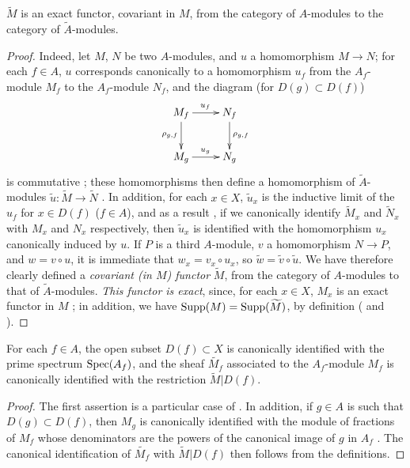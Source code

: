 \begin{proposition}[1.3.5]
\label{1.1.3.5}
$\widetilde{M}$ is an exact functor, covariant in $M$, from the category of $A$-modules to the category of $\widetilde{A}$-modules.
\end{proposition}

\begin{proof}
\label{proof-1.1.3.5}
Indeed, let $M$, $N$ be two $A$-modules, and $u$ a homomorphism $M\to N$;
for each $f\in A$, $u$ corresponds canonically to a homomorphism $u_f$ from the $A_f$-module $M_f$ to the $A_f$-module $N_f$, and the diagram (for $D(g)\subset D(f)$)
\[
  \xymatrix{
    M_f\ar[r]^{u_f}\ar[d]_{\rho_{g,f}} & N_f\ar[d]^{\rho_{g,f}}\\
    M_g\ar[r]^{u_g} & N_g
  }
\]
is commutative ;
these homomorphisms then define a homomorphism of $\widetilde{A}$-modules $\widetilde{u}:\widetilde{M}\to\widetilde{N}$ .
In addition, for each $x\in X$, $\widetilde{u}_x$ is the inductive limit of the $u_f$ for $x\in D(f)$ ($f\in A$), and as a result , if we canonically identify $\widetilde{M}_x$ and $\widetilde{N}_x$ with $M_x$ and $N_x$ respectively, then $\widetilde{u}_x$ is identified with the homomorphism $u_x$ canonically induced by $u$.
If $P$ is a third $A$-module, $v$ a homomorphism $N\to P$, and $w=v\circ u$, it is immediate that $w_x=v_x\circ u_x$, so $\widetilde{w}=\widetilde{v}\circ\widetilde{u}$.
We have therefore clearly defined a \emph{covariant (in $M$) functor} $\widetilde{M}$, from the category of $A$-modules to that of $\widetilde{A}$-modules.
\emph{This functor is exact}, since, for each $x\in X$, $M_x$ is an exact functor in $M$ ;
in addition, we have $\operatorname{Supp}(M)=\operatorname{Supp}(\widetilde{M})$, by definition ( and ).
\end{proof}

\begin{proposition}[1.3.6]
\label{1.1.3.6}
For each $f\in A$, the open subset $D(f)\subset X$ is canonically identified with the prime spectrum $\operatorname{Spec}(A_f)$, and the sheaf $\widetilde{M_f}$ associated to the $A_f$-module $M_f$ is canonically identified with the restriction $\widetilde{M}|D(f)$.
\end{proposition}

\begin{proof}
\label{proof-1.1.3.6}
The first assertion is a particular case of .
In addition, if $g\in A$ is such that $D(g)\subset D(f)$, then $M_g$ is canonically identified with the module of fractions of $M_f$ whose denominators are the powers of the canonical image of $g$ in $A_f$ .
The canonical identification of $\widetilde{M_f}$ with $\widetilde{M}|D(f)$ then follows from the definitions.
\end{proof}


